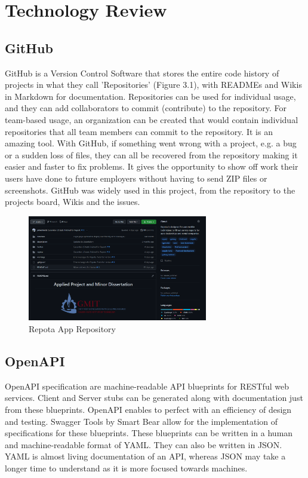 \chapter{Technology Review}

\section{GitHub}
GitHub is a Version Control Software that stores the entire code history of projects in what they call 'Repositories' (Figure 3.1), with READMEs and Wikis in Markdown for documentation. Repositories can be used for individual usage, and they can add collaborators to commit (contribute) to the repository. For team-based usage, an organization can be created that would contain individual repositories that all team members can commit to the repository. It is an amazing tool. With GitHub, if something went wrong with a project, e.g. a bug or a sudden loss of files, they can all be recovered from the repository making it easier and faster to fix problems. It gives the opportunity to show off work their users have done to future employers without having to send ZIP files or screenshots. GitHub was widely used in this project, from the repository to the projects board, Wikis and the issues.

\begin{figure}[H]
    \caption{Repota App Repository}
    \label{image:gitRepo}
    \centering
    \includegraphics[width=0.7\textwidth]{images/misc/git-repo.png}
\end{figure}

\section{OpenAPI}
OpenAPI specification are machine-readable API blueprints for RESTful web services. Client and Server stubs can be generated along with documentation just from these blueprints. OpenAPI enables to perfect with an efficiency of design and testing. Swagger Tools by Smart Bear allow for the implementation of specifications for these blueprints. These blueprints can be written in a human and machine-readable format of YAML. They can also be written in JSON.  YAML is almost living documentation of an API, whereas JSON may take a longer time to understand as it is more focused towards machines. \cite{ref6}

